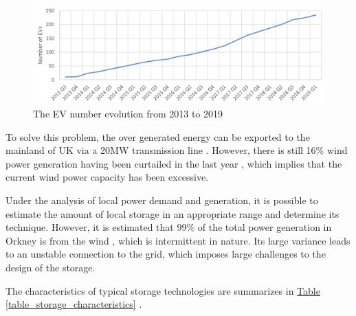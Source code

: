 \documentclass[12pt,a4paper]{report}
\begin{document}
        \begin{figure}[ht]
            \centerline{\includegraphics[scale=1]{evnumber}}
            \caption{The EV number evolution from 2013 to 2019}
            \label{fig_EV_number}
        \end{figure}

        To solve this problem, the over generated energy can be exported to the mainland of UK via a 20MW transmission line \cite{book:Orkneypowerexport}. 
        However, there is still 16\% wind power generation having been curtailed in the last year \cite{report:OrkneyAudit}, which implies that the current wind power capacity has been excessive.
        
        Under the analysis of local power demand and generation, it is possible to estimate the amount of local storage in an appropriate range and determine its technique. 
        However, it is estimated that 99\% of the total power generation in Orkney is from the wind \cite{report:OrkneyAudit}, 
        which is intermittent in nature. Its large variance leads to an unstable connection to the grid, 
        which imposes large challenges to the design of the storage.

        The characteristics of typical storage technologies are summarizes in \hyperref[table_storage_characteristics]{Table \ref*{table_storage_characteristics}} \cite{paper:Barton2004} \cite{paper:Vazquez2010}.
\end{document}
